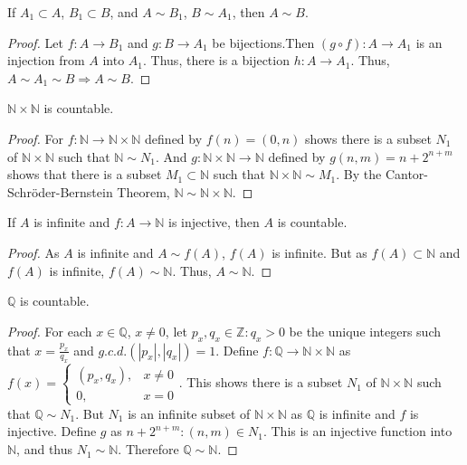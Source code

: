 \documentclass[crop=false,class=book,oneside]{standalone}
\begin{document}
            \begin{theorem}
            If $A_1 \subset A$, $B_1 \subset B$, and $A\sim B_1$, $B \sim A_1$, then $A\sim B$.
            \end{theorem}
            \begin{proof}
            Let $f:A\rightarrow B_1$ and $g:B\rightarrow A_1$ be bijections.Then $(g\circ f):A\rightarrow A_1$ is an injection from $A$ into $A_1$. Thus, there is a bijection $h:A\rightarrow A_1$. Thus, $A\sim A_1 \sim B\Rightarrow A\sim B$.
            \end{proof}
            \begin{theorem}
            $\mathbb{N}\times \mathbb{N}$ is countable.
            \end{theorem}
            \begin{proof}
            For $f:\mathbb{N} \rightarrow \mathbb{N}\times \mathbb{N}$ defined by $f(n) = (0,n)$ shows there is a subset $N_1$ of $\mathbb{N} \times \mathbb{N}$ such that $\mathbb{N}\sim N_1$. And $g:\mathbb{N}\times \mathbb{N} \rightarrow \mathbb{N}$ defined by $g(n,m) =n+2^{n+m}$ shows that there is a subset $M_1 \subset \mathbb{N}$ such that $\mathbb{N} \times \mathbb{N} \sim M_1$. By the Cantor-Schr\"{o}der-Bernstein Theorem, $\mathbb{N} \sim \mathbb{N}\times \mathbb{N}$.
            \end{proof}
            \begin{lemma}
            If $A$ is infinite and $f:A\rightarrow \mathbb{N}$ is injective, then $A$ is countable.
            \end{lemma}
            \begin{proof}
            As $A$ is infinite and $A\sim f(A)$, $f(A)$ is infinite. But as $f(A)\subset \mathbb{N}$ and $f(A)$ is infinite, $f(A)\sim \mathbb{N}$. Thus, $A\sim \mathbb{N}$. 
            \end{proof}
            \begin{theorem}
            $\mathbb{Q}$ is countable.
            \end{theorem}
            \begin{proof}
            For each $x\in \mathbb{Q}$, $x\ne 0$, let $p_x,q_x\in\mathbb{Z}:q_x>0$ be the unique integers such that $x = \frac{p_x}{q_x}$ and $g.c.d.(|p_x|,|q_x|)=1$. Define $f:\mathbb{Q}\rightarrow \mathbb{N}\times \mathbb{N}$ as $f(x) = \begin{cases}(p_x,q_x), & x\ne 0 \\ 0, & x=0\end{cases}$. This shows there is a subset $N_1$ of $\mathbb{N}\times \mathbb{N}$ such that $\mathbb{Q}\sim N_1$. But $N_1$ is an infinite subset of $\mathbb{N}\times\mathbb{N}$ as $\mathbb{Q}$ is infinite and $f$ is injective. Define $g$ as $n+2^{n+m}:(n,m)\in N_1$. This is an injective function into $\mathbb{N}$, and thus $N_1 \sim \mathbb{N}$. Therefore $\mathbb{Q}\sim \mathbb{N}$.
            \end{proof}
\end{document}
